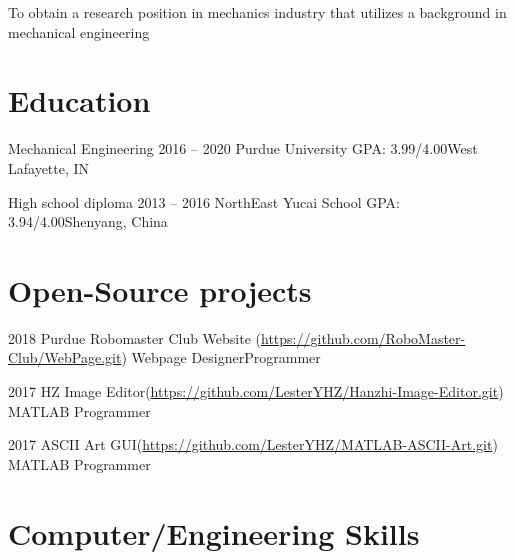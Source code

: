 \documentclass{tccv}
\begin{document}
To obtain a research position in mechanics industry that utilizes a background in mechanical engineering

\section{Education}

\begin{yearlist}

\item[Mechanical Engineering]{2016 -- 2020}
     {Purdue University}
     {GPA: 3.99/4.00\newline West Lafayette, IN}
     
\item[High school diploma]{2013 -- 2016}
     {NorthEast Yucai School}
     {GPA: 3.94/4.00\newline Shenyang, China}

\end{yearlist}

\section{Open-Source projects}

\begin{yearlist}

\item{2018}
     {Purdue Robomaster Club Website\newline
     (\href{https://github.com/RoboMaster-Club/WebPage.git}{https://github.com/RoboMaster-Club/WebPage.git})}
     {Webpage Designer\newline Programmer}

\item{2017}
     {HZ Image Editor\newline (\href{https://github.com/LesterYHZ/Hanzhi-Image-Editor.git}{https://github.com/LesterYHZ/Hanzhi-Image-Editor.git})}
     {MATLAB Programmer}

\item{2017}
     {ASCII Art GUI\newline (\href{https://github.com/LesterYHZ/MATLAB-ASCII-Art.git}{https://github.com/LesterYHZ/MATLAB-ASCII-Art.git})}
     {MATLAB Programmer}


\end{yearlist}


\section{Computer/Engineering Skills}
\end{document}
